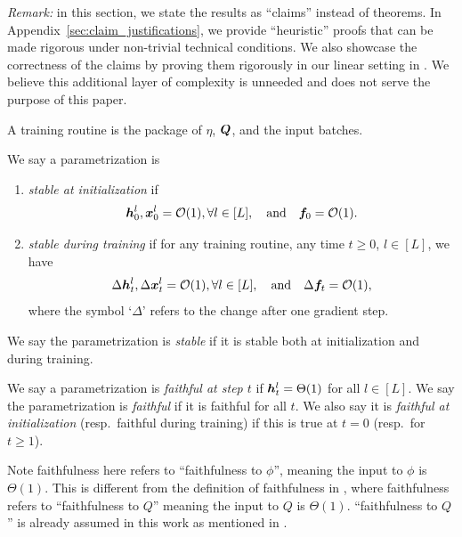 \documentclass{article}
\theoremstyle{plain}
\theoremstyle{definition}
\begin{document}
\emph{Remark:} in this section, we state the results as ``claims'' instead of theorems. In Appendix~\ref{sec:claim_justifications}, we provide ``heuristic'' proofs that can be made rigorous under non-trivial technical conditions. We also showcase the correctness of the claims by proving them rigorously in our linear setting in . We believe this additional layer of complexity is unneeded and does not serve the purpose of this paper. 

\begin{defn}\label{defn:training_routine}
    A training routine is the package of $\eta$, $\boldsymbol{Q}$, and the input batches.
\end{defn}

\begin{defn}[Stability]\label{defn:stability} 
    We say a parametrization is
    \begin{enumerate}
    \item \emph{stable at initialization} if %
    \begin{equation}
    \hh_{0}^{l},\xx_{0}^{l}=\cO(1),\forall l\in[L],\quad\text{and}\quad \ff_{0}=\cO(1).\label{eq:initstable}
    \end{equation}
    \item \emph{stable during training} if for any training routine, any time $t\ge0$, $l\in[L]$, we have 
    \[
    \Delta \boldsymbol{h}_{t}^{l},\Delta \boldsymbol{x}_{t}^{l}=\mathcal{O}(1),\forall l\in[L],\quad\text{and}\quad \Delta\boldsymbol{f}_{t}=\mathcal{O}(1),
    \]
     where the symbol `$\Delta$' refers to the change after one gradient step.\\
    \end{enumerate}
   
    We say the parametrization is \emph{stable} if it is stable both at initialization and during training.
\end{defn}

\begin{defn}[Faithful]\label{defn:faithful} 
    We say a parametrization is \emph{faithful at step $t$} if $\boldsymbol{h}_{t}^{l}=\Theta(1)$ for all $l\in[L]$.
    We say the parametrization is \emph{faithful} if it is faithful for all $t$.
    We also say it is \emph{faithful at initialization} (resp.\ faithful during training) if this is true at $t = 0$ (resp.\ for $t \ge 1$).
\end{defn}
Note faithfulness here refers to ``faithfulness to $\phi$'', meaning the input to $\phi$ is $\Theta(1)$. This is different from the definition of faithfulness in \citet{yang2023tensor}, where faithfulness refers to ``faithfulness to $Q$'' meaning the input to $Q$ is $\Theta(1)$. ``faithfulness to $Q$'' is already assumed in this work as mentioned in .
\end{document}
